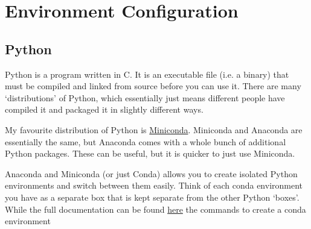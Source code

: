 

    \section{Environment Configuration}

    \subsection{Python}
    Python is a program written in C. It is an executable file (i.e. a binary) that must be compiled and linked
    from source before you can use it. There are many `distributions' of Python, which essentially just means
    different people have compiled it and packaged it in slightly different ways.

    My favourite distribution of Python is \href{https://docs.conda.io/en/latest/miniconda.html}{Miniconda}. Miniconda
    and Anaconda are essentially the same, but Anaconda comes with a whole bunch of additional Python packages. These
    can be useful, but it is quicker to just use Miniconda.



    Anaconda and Miniconda (or just Conda) allows you to create isolated Python environments
    and switch between them easily. Think of each conda environment you have as a separate box that is
    kept separate from the other Python `boxes'. While the full documentation can be found \href{https://docs.conda.io/projects/conda/en/latest/user-guide/tasks/manage-environments.html}{here}
    the commands to create a conda environment






